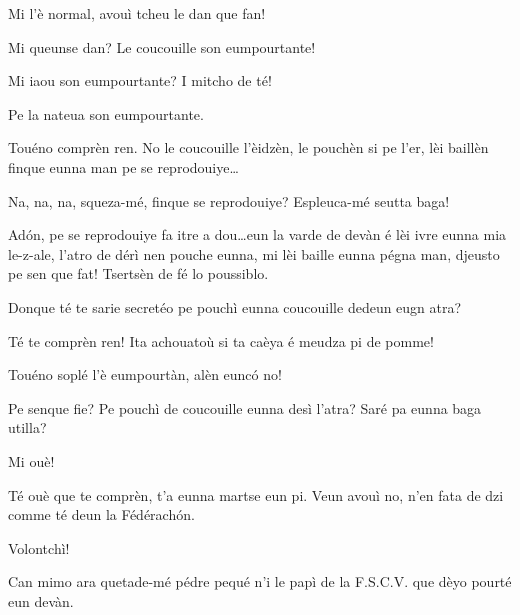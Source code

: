 \begin{drama}
\Tuenospeaks Mi l'è normal, avouì tcheu le dan que fan!

\Richardspeaks Mi queunse dan? Le coucouille son eumpourtante! 

\Tuenospeaks Mi iaou son eumpourtante? I mitcho de té!

\Gerominespeaks Pe la nateua son eumpourtante.

\Richardspeaks{} Touéno comprèn ren. No le coucouille l'èidzèn, le pouchèn si pe l'er, lèi baillèn finque eunna man pe se reprodouiye\ldots

\Tuenospeaks{} Na, na, na, squeza-mé, finque se reprodouiye? Espleuca-mé seutta baga!

\Richardspeaks Ad\'on, pe se reprodouiye fa itre a dou\ldots eun la varde de devàn é lèi ivre eunna mia le-z-ale, l'atro de dérì nen pouche eunna, mi lèi baille eunna pégna man, djeusto pe sen que fat! Tsertsèn de fé lo poussiblo.

\Tuenospeaks Donque té te sarie secretéo pe pouchì eunna coucouille dedeun eugn atra?

\Richardspeaks Té te comprèn ren! Ita achouatoù si ta caèya é meudza pi de pomme!

\Gerominespeaks{} Touéno soplé l'è eumpourtàn, alèn eunc\'o no!

\Tuenospeaks Pe senque fie? Pe pouchì de coucouille eunna desì l'atra? Saré pa eunna baga utilla?

\Gerominespeaks Mi ouè!

\Richardspeaks{} Té ouè que te comprèn, t'a eunna martse eun pi. Veun avouì no, n'en fata de dzi comme té deun la Fédérach\'on.

\Gerominespeaks Volontchì!


\Richardspeaks Can mimo ara quetade-mé pédre pequé n'i le papì de la F.S.C.V. que dèyo pourté eun devàn.





\end{drama}
